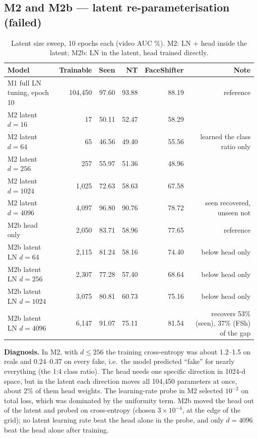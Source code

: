 \documentclass[10pt,a4paper]{article}
\newcommand{\Fail}{\textcolor{fail}{\textbf{failed}}}
\begin{document}
\subsection{M2 and M2b --- latent re-parameterisation (\Fail)}\label{sec:m2}
\begin{table}[H]\centering\small
\caption{Latent size sweep, 10 epochs each (video AUC \%). M2: LN + head inside the latent; M2b: LN in the latent, head trained directly.}\label{tab:m2}
\begin{tabularx}{\linewidth}{@{}lRRRRR@{}}
\toprule
Model & Trainable & Seen & NT & FaceShifter & Note\\
\midrule
M1 full LN tuning, epoch 10 & 104,450 & 97.60 & 93.88 & 88.19 & reference\\
M2 latent \(d=16\) & 17 & 50.11 & 52.47 & 58.29 & \\
M2 latent \(d=64\) & 65 & 46.56 & 49.40 & 55.56 & learned the class ratio only\\
M2 latent \(d=256\) & 257 & 55.97 & 51.36 & 48.96 & \\
M2 latent \(d=1024\) & 1,025 & 72.63 & 58.63 & 67.58 & \\
M2 latent \(d=4096\) & 4,097 & 96.80 & 90.76 & 78.72 & seen recovered, unseen not\\
\midrule
M2b head only & 2,050 & 83.71 & 58.96 & 77.65 & reference\\
M2b latent LN \(d=64\) & 2,115 & 81.24 & 58.16 & 74.40 & below head only\\
M2b latent LN \(d=256\) & 2,307 & 77.28 & 57.40 & 68.64 & below head only\\
M2b latent LN \(d=1024\) & 3,075 & 80.81 & 60.73 & 75.16 & below head only\\
M2b latent LN \(d=4096\) & 6,147 & 91.07 & 75.11 & 81.54 & recovers 53\% (seen), 37\% (FSh) of the gap\\
\bottomrule
\end{tabularx}
\end{table}
\textbf{Diagnosis.} In M2, with \(d\le256\) the training cross-entropy was about 1.2--1.5 on reals and
0.24--0.37 on every fake, i.e.\ the model predicted ``fake'' for nearly everything (the 1:4 class
ratio). The head needs one specific direction in 1024-d space, but in the latent each direction moves
all 104,450 parameters at once, about 2\% of them head weights. The learning-rate probe in M2 selected
\(10^{-2}\) on total loss, which was dominated by the uniformity term. M2b moved the head out of the
latent and probed on cross-entropy (chosen \(3\times10^{-4}\), at the edge of the grid); no latent
learning rate beat the head alone in the probe, and only \(d=4096\) beat the head alone after training.
\end{document}
